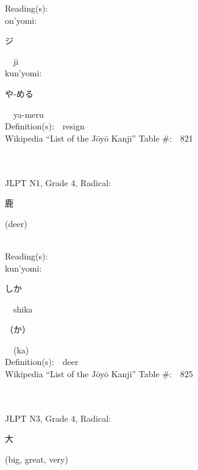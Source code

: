 \begin{multicols}{2}
Reading(s):\ \ \\
{\hspace*{1em}}on'yomi:\ \ \\
{\hspace*{2em}}{\begin{CJK}{UTF8}{min} ジ \end{CJK}}\ \ ji\ \ \\
{\hspace*{1em}}kun'yomi:\ \ \\
{\hspace*{2em}}{\begin{CJK}{UTF8}{min} や-める \end{CJK}}\ \ ya-meru\ \ \\
Definition(s):\ \ resign \\
Wikipedia ``List of the J\=oy\=o Kanji'' Table \#:\ \ 821 \\
\ \ \\
{\fontsize{34pt}{40pt}  }\ \ \\  %
{JLPT N1, Grade 4, Radical:\ \ {\begin{CJK}{UTF8}{min} 鹿 \end{CJK}} (deer) } \\
Reading(s):\ \ \\
{\hspace*{1em}}kun'yomi:\ \ \\
{\hspace*{2em}}{\begin{CJK}{UTF8}{min} しか \end{CJK}}\ \ shika\ \ \\
{\hspace*{2em}}{\begin{CJK}{UTF8}{min} （か） \end{CJK}}\ \ (ka)\ \ \\
Definition(s):\ \ deer \\
Wikipedia ``List of the J\=oy\=o Kanji'' Table \#:\ \ 825 \\
\ \ \\
{\fontsize{34pt}{40pt}  }\ \ \\  %
{JLPT N3, Grade 4, Radical:\ \ {\begin{CJK}{UTF8}{min} 大 \end{CJK}} (big, great, very) } \\

\end{multicols}
